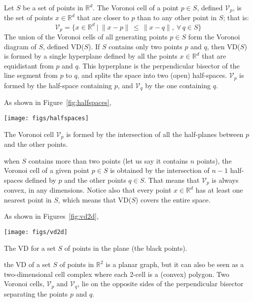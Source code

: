 Let $S$ be a set of points in $\mathbb{R}^d$. 
The Voronoi cell of a point $p \in S$, defined $\mathcal{V}_{p}$, is the set of points $x \in \mathbb{R}^d$ that are closer to $p$ than to any other point in $S$; that is:
\begin{equation}
\mathcal{V}_p = \{x \in \mathbb{R}^{d} \ | \ \|x-p\| \, \leq \, \|x-q\|, \ \forall \, q \in S \} 
\end{equation}
The union of the Voronoi cells of all generating points $p \in S$ form the Voronoi diagram of $S$, defined VD($S$). 
If $S$ contains only two points $p$ and $q$, then VD($S$) is formed by a single hyperplane defined by all the points $x \in \mathbb{R}^d$ that are equidistant from $p$ and $q$. 
This hyperplane is the perpendicular bisector of the line segment from $p$ to $q$, and splits the space into two (open) half-spaces. 
$\mathcal{V}_p$ is formed by the half-space containing $p$, and $\mathcal{V}_q$ by the one containing $q$. 

%

As shown in Figure~\ref{fig:halfspaces}, 
\begin{marginfigure}
  \centering
  \texttt{[image: figs/halfspaces]}
  \caption{The Voronoi cell $\mathcal{V}_p$ is formed by the intersection of all the half-planes between $p$ and the other points.}%
\label{fig:halfspaces}
\end{marginfigure}
when $S$ contains more than two points (let us say it contains $n$ points), the Voronoi cell of a given point $p \in S$ is obtained by the intersection of $n-1$ half-spaces defined by $p$ and the other points $q \in S$. 
That means that $\mathcal{V}_{p}$ is always convex, in any dimensions. Notice also that every point $x \in \mathbb{R}^d$ has at least one nearest point in $S$, which means that VD($S$) covers the entire space.

%

As shown in Figures~\ref{fig:vd2d}, 
\begin{marginfigure}
  \centering
  \texttt{[image: figs/vd2d]}
  \caption{The VD for a set $S$ of points in the plane (the black points).}%
\label{fig:vd2d}
\end{marginfigure}
the VD of a set $S$ of points in $\mathbb{R}^2$ is a planar graph, but it can also be seen as a two-dimensional cell complex where each 2-cell is a (convex) polygon. 
Two Voronoi cells, $\mathcal{V}_{p}$ and $\mathcal{V}_{q}$, lie on the opposite sides of the perpendicular bisector separating the points $p$ and $q$. 

